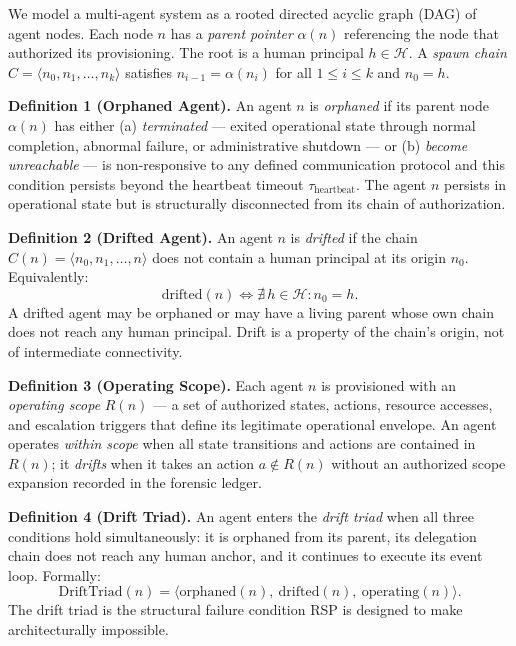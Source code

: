 We model a multi-agent system as a rooted directed acyclic graph (DAG) of agent nodes. Each node $n$ has a \emph{parent pointer} $\alpha(n)$ referencing the node that authorized its provisioning. The root is a human principal $h \in \mathcal{H}$. A \emph{spawn chain} $C = \langle n_0, n_1, \ldots, n_k \rangle$ satisfies $n_{i-1} = \alpha(n_i)$ for all $1 \leq i \leq k$ and $n_0 = h$.

\medskip
\noindent\textbf{Definition 1 (Orphaned Agent).} An agent $n$ is \emph{orphaned} if its parent node $\alpha(n)$ has either (a) \emph{terminated} — exited operational state through normal completion, abnormal failure, or administrative shutdown — or (b) \emph{become unreachable} — is non-responsive to any defined communication protocol and this condition persists beyond the heartbeat timeout $\tau_{\text{heartbeat}}$. The agent $n$ persists in operational state but is structurally disconnected from its chain of authorization.

\medskip
\noindent\textbf{Definition 2 (Drifted Agent).} An agent $n$ is \emph{drifted} if the chain $C(n) = \langle n_0, n_1, \ldots, n \rangle$ does not contain a human principal at its origin $n_0$. Equivalently:
\begin{equation}
\text{drifted}(n) \iff \nexists\, h \in \mathcal{H} : n_0 = h.
\label{eq:intro-drifted}
\end{equation}
A drifted agent may be orphaned or may have a living parent whose own chain does not reach any human principal. Drift is a property of the chain's origin, not of intermediate connectivity.

\medskip
\noindent\textbf{Definition 3 (Operating Scope).} Each agent $n$ is provisioned with an \emph{operating scope} $R(n)$ — a set of authorized states, actions, resource accesses, and escalation triggers that define its legitimate operational envelope. An agent operates \emph{within scope} when all state transitions and actions are contained in $R(n)$; it \emph{drifts} when it takes an action $a \notin R(n)$ without an authorized scope expansion recorded in the forensic ledger.

\medskip
\noindent\textbf{Definition 4 (Drift Triad).} An agent enters the \emph{drift triad} when all three conditions hold simultaneously: it is orphaned from its parent, its delegation chain does not reach any human anchor, and it continues to execute its event loop. Formally:
\begin{equation}
\text{DriftTriad}(n) = \bigl\langle \text{orphaned}(n),\ \text{drifted}(n),\ \text{operating}(n) \bigr\rangle.
\label{eq:intro-drift-triad}
\end{equation}
The drift triad is the structural failure condition RSP is designed to make architecturally impossible.

